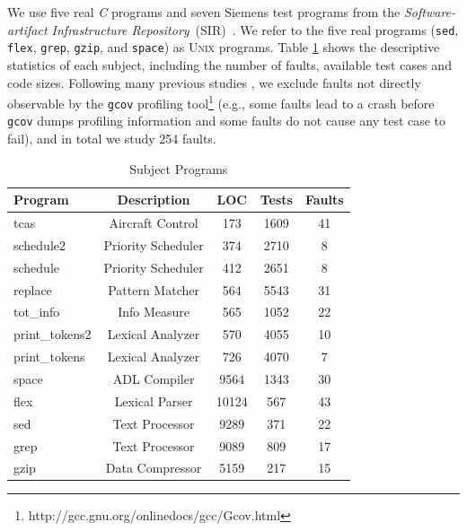 We use five real {\em C} programs and seven Siemens test programs from the
{\em Software-artifact Infrastructure Repository}~(SIR)~\citep{doESE05}. We refer to the five real programs (\texttt{sed}, \texttt{flex}, \texttt{grep}, \texttt{gzip}, and \texttt{space}) as \textsc{Unix} programs. Table \ref{dataset} shows the descriptive statistics of each subject,
including the number of faults, available test cases and code sizes. Following many previous studies \citep[e.g.][]{JHS02,Abreu:2009.jss}, we exclude faults not directly observable by the {\tt gcov} profiling
tool\footnote{http://gcc.gnu.org/onlinedocs/gcc/Gcov.html} (e.g., some faults lead to a crash before \texttt{gcov} dumps profiling information and some faults do not cause any test case to fail), and in total we study 254 faults.

\begin{table}[!htbp]
	\centering
	\caption{Subject Programs}
	\renewcommand{\arraystretch}{1.5}
	\small
    \begin{tabular}{|l|c|c|c|c|} \hline
        Program & Description & LOC  & Tests & Faults\\ \hline\hline
		tcas & Aircraft Control & 173 & 1609 & 41\\ \hline
        schedule2 & Priority Scheduler & 374  & 2710  & 8\\ \hline
        schedule & Priority Scheduler & 412 & 2651  & 8\\ \hline
        replace & Pattern Matcher & 564 & 5543  & 31\\ \hline
		tot\_info & Info Measure & 565 & 1052  & 22\\ \hline
        print\_tokens2 & Lexical Analyzer & 570  & 4055  & 10\\ \hline
        print\_tokens & Lexical Analyzer & 726 & 4070  & 7\\ \hline
        space & ADL Compiler & 9564 & 1343 & 30\\ \hline
        flex & Lexical Parser & 10124 & 567  & 43\\ \hline
        sed & Text Processor & 9289  & 371  & 22\\ \hline
        grep & Text Processor & 9089 & 809  & 17\\ \hline
        gzip & Data Compressor & 5159 & 217  & 15\\ \hline
	\end{tabular}
	\label{dataset}
\end{table}

